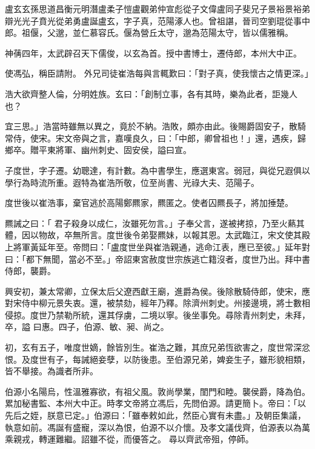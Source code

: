 
\begin{pinyinscope}

 盧玄玄孫思道昌衡元明潛盧柔子愷盧觀弟仲宣彪從子文偉盧同子斐兄子景裕景裕弟辯光光子賁光從弟勇盧誕盧玄，字子真，范陽涿人也。曾祖諶，晉司空劉琨從事中郎。祖偃，父邈，並仁慕容氏。偃為營丘太守，邈為范陽太守，皆以儒雅稱。



 神蒨四年，太武辟召天下儒俊，以玄為首。授中書博士，遷侍郎，本州大中正。



 使馮弘，稱臣請附。
 外兄司徒崔浩每與言輒歎曰：「對子真，使我懷古之情更深。」



 浩大欲齊整人倫，分明姓族。玄曰：「創制立事，各有其時，樂為此者，詎幾人也？



 宜三思。」浩當時雖無以異之，竟於不納。浩敗，頗亦由此。後賜爵固安子，散騎常侍，使宋。宋文帝與之言，嘉嘆良久，曰：「中郎，卿曾祖也！」還，遇疾，歸鄉卒。贈平東將軍、幽州刺史、固安侯，謚曰宣。



 子度世，字子遷。幼聰達，有計數。為中書學生，應選東宮。弱冠，與從兄遐俱以學行為時流所重。遐特為崔浩所敬，位至尚書、光祿大夫、范陽子。



 度世後以崔浩事，棄官逃於高陽鄭羆家，羆匿之。使者囚羆長子，將加捶楚。



 羆誡之曰：「
 君子殺身以成仁，汝雖死勿言。」子奉父言，遂被拷掠，乃至火爇其體，因以物故，卒無所言。度世後令弟娶羆妹，以報其恩。太武臨江，宋文使其殿上將軍黃延年至。帝問曰：「盧度世坐與崔浩親通，逃命江表，應已至彼。」延年對曰：「都下無聞，當必不至。」帝詔東宮赦度世宗族逃亡籍沒者，度世乃出。拜中書侍郎，襲爵。



 興安初，兼太常卿，立保太后父遼西獻王廟，進爵為侯。後除散騎侍郎，使宋，應對宋侍中柳元景失衷。還，被禁劾，經年乃釋。除濟州刺史。州接邊境，將士數相侵掠。度世乃禁勒所統，還其俘虜，二境以寧。後坐事免。尋除青州刺史，未拜，卒，謚
 曰惠。四子，伯源、敏、昶、尚之。



 初，玄有五子，唯度世嫡，餘皆別生。崔浩之難，其庶兄弟恆欲害之，度世常深忿恨。及度世有子，每誡絕妾孽，以防後患。至伯源兄弟，婢妾生子，雖形貌相類，皆不舉接。為識者所非。



 伯源小名陽烏，性溫雅寡欲，有祖父風。敦尚學業，閨門和睦。襲侯爵，降為伯。累加秘書監、本州大中正。時孝文帝將立馮后，先問伯源。請更簡卜。帝曰：「以先后之姪，朕意已定。」伯源曰：「雖奉敕如此，然臣心實有未盡。」及朝臣集議，執意如前。馮誕有盛寵，深以為恨，伯源不以介懷。及孝文議伐齊，伯源表以為萬乘親戎，轉運難繼。詔雖不從，而優答之。
 尋以齊武帝殂，停師。




\end{pinyinscope}
